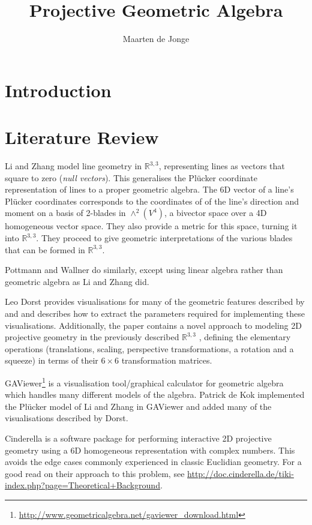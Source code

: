 \documentclass[a4paper, 10pt]{article}
\author{Maarten de Jonge}
\title{Projective Geometric Algebra}
\begin{document}
\newcommand{\rp}{$\mathbb{R}^{3,3}$ }

\maketitle

\section{Introduction}

\section{Literature Review}
Li and Zhang\cite{hangbo2011} model line geometry in $\mathbb{R}^{3,3}$,
representing lines as vectors that square to zero (\emph{null vectors}). This
generalises the Pl\"{u}cker coordinate representation of lines to a proper
geometric algebra. The 6D vector of a line's Pl\"{u}cker coordinates corresponds
to the coordinates of of the line's direction and moment on a basis of 2-blades
in $\wedge^2(V^4)$, a bivector space over a 4D homogeneous vector space. They
also provide a metric for this space, turning it into $\mathbb{R}^{3, 3}$.
They proceed to give geometric interpretations of the various blades that can
be formed in $\mathbb{R}^{3, 3}$.

Pottmann and Wallner\cite{pottmann2001computational} do similarly, except using
linear algebra rather than geometric algebra as Li and Zhang did.

Leo Dorst\cite{dorst2013versors} provides visualisations for many of the
geometric features described by \cite{hangbo2011} and
\cite{pottmann2001computational} and describes how to extract the parameters
required for implementing these visualisations. Additionally, the paper contains
a novel approach to modeling 2D projective geometry in the previously described
\rp, defining the elementary operations (translations, scaling, perspective
transformations, a rotation and a squeeze) in terms of their $6 \times 6$
transformation matrices.

GAViewer\footnote{\url{http://www.geometricalgebra.net/gaviewer\_download.html}}
is a visualisation tool/graphical calculator for geometric algebra which handles
many different models of the algebra. Patrick de Kok\cite{dekok2012} implemented
the Pl\"{u}cker model of Li and Zhang in GAViewer and added many of the
visualisations described by Dorst.

Cinderella\cite{richter1999interactive} is a software package for performing
interactive 2D projective geometry using a 6D homogeneous representation with
complex numbers. This avoids the edge cases commonly experienced in classic
Euclidian geometry.  For a good read on their approach to this problem, see
\url{http://doc.cinderella.de/tiki-index.php?page=Theoretical+Background}.
\end{document}
